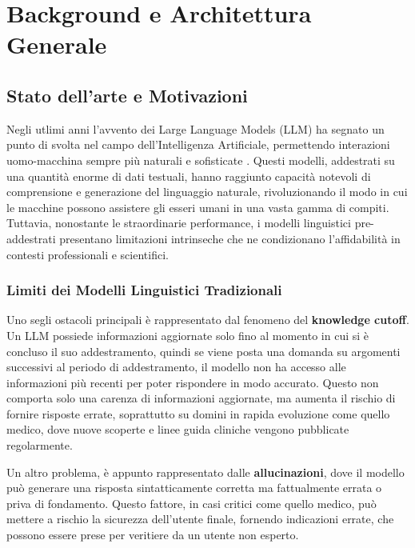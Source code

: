 \newpage\pagestyle{main}

\chapter{Background e Architettura Generale}\label{chap:first}

\inlineminitoc

\section{Stato dell'arte e Motivazioni}

Negli utlimi anni l'avvento dei Large Language Models (LLM) ha segnato un punto di svolta nel campo dell'Intelligenza Artificiale, permettendo interazioni uomo-macchina sempre più naturali e sofisticate \cite{dubey2024llama3}. Questi modelli, addestrati su una quantità enorme di dati testuali, hanno raggiunto capacità notevoli di comprensione e generazione del linguaggio naturale, rivoluzionando il modo in cui le macchine possono assistere gli esseri umani in una vasta gamma di compiti. Tuttavia, nonostante le straordinarie performance, i modelli linguistici pre-addestrati presentano limitazioni intrinseche che ne condizionano l'affidabilità in contesti professionali e scientifici.

\subsection{Limiti dei Modelli Linguistici Tradizionali}

Uno segli ostacoli principali è rappresentato dal fenomeno del \textbf{knowledge cutoff}. Un LLM possiede informazioni aggiornate solo fino al momento in cui si è concluso il suo addestramento, quindi se viene posta una domanda su argomenti successivi al periodo di addestramento, il modello non ha accesso alle informazioni più recenti per poter rispondere in modo accurato. Questo non comporta solo una carenza di informazioni aggiornate, ma aumenta il rischio di fornire risposte errate, soprattutto su domini in rapida evoluzione come quello medico, dove nuove scoperte e linee guida cliniche vengono pubblicate regolarmente.

Un altro problema, è appunto rappresentato dalle \textbf{allucinazioni}, dove il modello può generare una risposta sintatticamente corretta ma fattualmente errata o priva di fondamento. Questo fattore, in casi critici come quello medico, può mettere a rischio la sicurezza dell'utente finale, fornendo indicazioni errate, che possono essere prese per veritiere da un utente non esperto.

